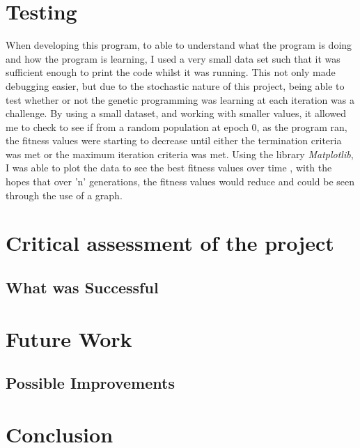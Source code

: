 \documentclass[11pt]{article}
\begin{document}
\section{Testing}
When developing this program, to able to understand what the program is doing and how the program is learning, I used a very small data set such that it was sufficient enough to print the code whilst it was running. This not only made debugging easier, but due to the stochastic nature of this project, being able to test whether or not the genetic programming was learning at each iteration was a challenge. By using a small dataset, and working with smaller values, it allowed me to check to see if from a random population at epoch 0, as the program ran, the fitness values were starting to decrease until either the termination criteria was met or the maximum iteration criteria was met. Using the library \textit{Matplotlib}, I was able to plot the data to see the best fitness values over time , with the hopes that over 'n' generations, the fitness values would reduce and could be seen through the use of a graph. 

\newpage
\section{Critical assessment of the project }
\subsection{What was Successful}

\newpage
\section{Future Work}
\subsection{Possible Improvements}

\newpage
\section{Conclusion}
\end{document}
